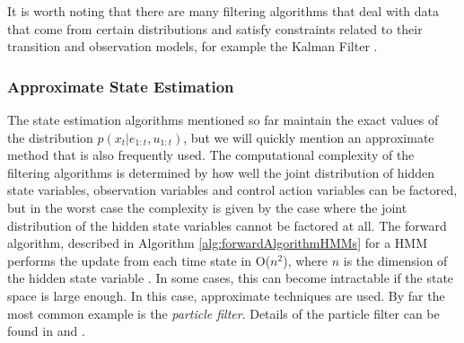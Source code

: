 
It is worth noting that there are many filtering algorithms that deal with data that come from certain distributions and satisfy constraints related to their transition and observation models, for example the Kalman Filter \cite[p.~43]{Thrun:2005:ProbabilisticRobotics}.







\subsubsection{Approximate State Estimation}
The state estimation algorithms mentioned so far maintain the exact values of the distribution $p(x_t | e_{1:t}, u_{1:t})$, but we will quickly mention an approximate method that is also frequently used. The computational complexity of the filtering algorithms is determined by how well the joint distribution of hidden state variables, observation variables and control action variables can be factored, but in the worst case the complexity is given by the case where the joint distribution of the hidden state variables cannot be factored at all. The forward algorithm, described in Algorithm \ref{alg:forwardAlgorithmHMMs} for a HMM performs the update from each time state in O($n^2$), where $n$ is the dimension of the hidden state variable \cite{Smyth1997ProbabilisticModels}.
In some cases, this can become intractable if the state space is large enough. %
In this case, approximate techniques are used. By far the most common example is the \textit{particle filter}. Details of the particle filter can be found in \cite[p~.96]{Thrun:2005:ProbabilisticRobotics} and \cite[p~.665]{KollerPGM}.
